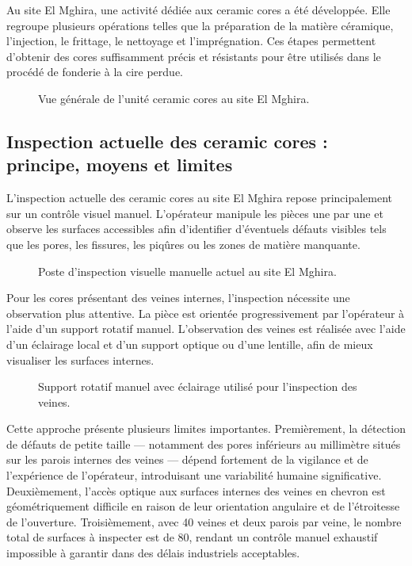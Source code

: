 Au site El Mghira, une activité dédiée aux ceramic cores a été développée. Elle regroupe
plusieurs opérations telles que la préparation de la matière céramique, l'injection, le
frittage, le nettoyage et l'imprégnation. Ces étapes permettent d'obtenir des cores
suffisamment précis et résistants pour être utilisés dans le procédé de fonderie à la
cire perdue.

\begin{figure}[H]
\centering
{}
\caption{Vue générale de l'unité ceramic cores au site El Mghira.}
\label{fig:unite_ceramic}
\end{figure}

\subsection{Inspection actuelle des ceramic cores : principe, moyens et limites}
L'inspection actuelle des ceramic cores au site El Mghira repose principalement sur un
contrôle visuel manuel. L'opérateur manipule les pièces une par une et observe les surfaces
accessibles afin d'identifier d'éventuels défauts visibles tels que les pores, les fissures,
les piqûres ou les zones de matière manquante.

\begin{figure}[H]
\centering
{}
\caption{Poste d'inspection visuelle manuelle actuel au site El Mghira.}
\label{fig:poste_inspection}
\end{figure}

Pour les cores présentant des veines internes, l'inspection nécessite une observation plus
attentive. La pièce est orientée progressivement par l'opérateur à l'aide d'un support
rotatif manuel. L'observation des veines est réalisée avec l'aide d'un éclairage local et
d'un support optique ou d'une lentille, afin de mieux visualiser les surfaces internes.

\begin{figure}[H]
\centering
{}
\caption{Support rotatif manuel avec éclairage utilisé pour l'inspection des veines.}
\label{fig:support_rotatif}
\end{figure}

Cette approche présente plusieurs limites importantes. Premièrement, la détection de défauts
de petite taille --- notamment des pores inférieurs au millimètre situés sur les parois
internes des veines --- dépend fortement de la vigilance et de l'expérience de l'opérateur,
introduisant une variabilité humaine significative. Deuxièmement, l'accès optique aux
surfaces internes des veines en chevron est géométriquement difficile en raison de leur
orientation angulaire et de l'étroitesse de l'ouverture. Troisièmement, avec 40 veines et
deux parois par veine, le nombre total de surfaces à inspecter est de 80, rendant un
contrôle manuel exhaustif impossible à garantir dans des délais industriels acceptables.

